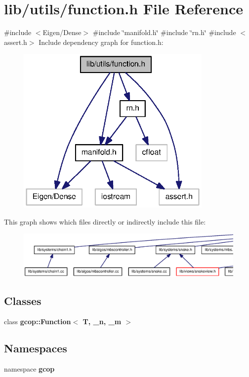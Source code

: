 \section{lib/utils/function.h \-File \-Reference}
\label{function_8h}
{\ttfamily \#include $<$\-Eigen/\-Dense$>$}\*
{\ttfamily \#include \char`\"{}manifold.\-h\char`\"{}}\*
{\ttfamily \#include \char`\"{}rn.\-h\char`\"{}}\*
{\ttfamily \#include $<$assert.\-h$>$}\*
\-Include dependency graph for function.\-h\-:\nopagebreak
\begin{figure}[H]
\begin{center}
\leavevmode
\includegraphics[width=270pt]{function_8h__incl}
\end{center}
\end{figure}
\-This graph shows which files directly or indirectly include this file\-:
\nopagebreak
\begin{figure}[H]
\begin{center}
\leavevmode
\includegraphics[width=350pt]{function_8h__dep__incl}
\end{center}
\end{figure}
\subsection*{\-Classes}
\begin{DoxyCompactItemize}
\item 
class {\bf gcop\-::\-Function$<$ T, \-\_\-n, \-\_\-m $>$}
\end{DoxyCompactItemize}
\subsection*{\-Namespaces}
\begin{DoxyCompactItemize}
\item 
namespace {\bf gcop}
\end{DoxyCompactItemize}
